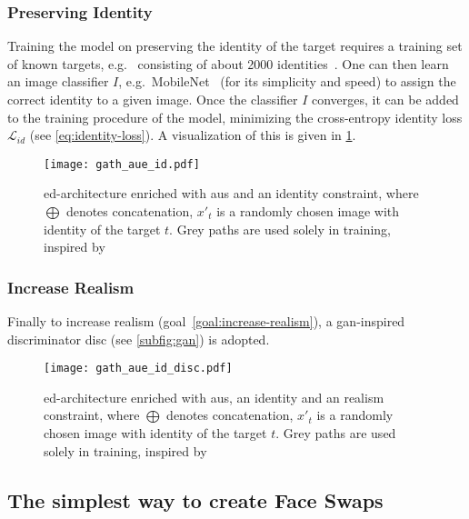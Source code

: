 \subsubsection{Preserving Identity}
Training the model on preserving the identity of the target requires a training
set of known targets, e.g.\ \cite{Chen.2015,Cao.2014,Tarres.2011} consisting of 
about 2000 identities~\cite{Pham.2018}. One can then learn an image classifier
\(I\), e.g.\ MobileNet~\cite{Howard.2017} (for its simplicity and speed) to
assign the correct identity to a given image. Once the classifier \(I\)
converges, it can be added to the training procedure of the model, minimizing
the cross-entropy identity loss \(\mathcal{L}_{id}\) (see \cref{eq:identity-loss}).
A visualization of this is given in \cref{fig:gath-aue-id}.
\begin{figure}[htp]
    \center{}
    \texttt{[image: gath\_aue\_id.pdf]}
    \caption{\gls{ed}-architecture enriched with \glspl{au} and an identity
    constraint, where \(\bigoplus\) denotes concatenation, \(x'_t\) is a randomly
    chosen image with identity of the target \(t\). Grey paths are used solely
    in training, inspired by~\cite{Mirsky.2020, Pham.2018}}\label{fig:gath-aue-id}
\end{figure}

\subsubsection{Increase Realism}
Finally to increase realism (goal~\ref{goal:increase-realism}), a \gls{gan}-inspired
discriminator \gls{disc} (see \cref{subfig:gan}) is adopted.
\begin{figure}[htp]
    \center{}
    \texttt{[image: gath\_aue\_id\_disc.pdf]}
    \caption{\gls{ed}-architecture enriched with \glspl{au}, an identity
    and an realism constraint, where \(\bigoplus\) denotes concatenation,
    \(x'_t\) is a randomly chosen image with identity of the target \(t\). Grey
    paths are used solely in training, inspired by~\cite{Mirsky.2020, Pham.2018}}\label{fig:gath-aue-id-disc}
\end{figure}

\subsection{The simplest way to create Face Swaps}